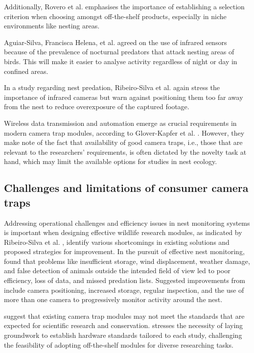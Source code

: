 \documentclass[class=report,11pt,crop=false]{standalone}
\begin{document}
Additionally, Rovero et al. \cite{rovero2013which} emphasises the importance of establishing a selection criterion when choosing amongst off-the-shelf products, especially in niche environments like nesting areas.

Aguiar-Silva, Francisca Helena, et al. \cite{aguiar-silva2017camera} agreed on the use of infrared sensors because of the prevalence of nocturnal predators that attack nesting areas of birds. This will make it easier to analyse activity regardless of night or day in confined areas.

In a study regarding nest predation, Ribeiro-Silva et al. \cite{ribeiro-silva2018testing} again stress the importance of infrared cameras but warn against positioning them too far away from the nest to reduce overexposure of the captured footage.

Wireless data transmission and automation emerge as crucial requirements in modern camera trap modules, according to Glover-Kapfer et al. \cite{glover2019camera}. However, they make note of the fact that availability of good camera traps, i.e., those that are relevant to the researchers’ requirements, is often dictated by the novelty task at hand, which may limit the available options for studies in nest ecology.  

\subsection{Challenges and limitations of consumer camera traps}

Addressing operational challenges and efficiency issues in nest monitoring systems is important when designing effective wildlife research modules, as indicated by Ribeiro-Silva  et al. \cite{ribeiro-silva2018testing}, identify various shortcomings in existing solutions and proposed strategies for improvement. In the pursuit of effective nest monitoring, \cite{ribeiro-silva2018testing} found that problems like insufficient storage, wind displacement, weather damage, and false detection of animals outside the intended field of view led to poor efficiency, loss of data, and missed predation lists. Suggested improvements from \cite{ribeiro-silva2018testing} include camera positioning, increased storage, regular inspection, and the use of more than one camera to progressively monitor activity around the nest. 

\cite{ahumada2020wildlife} suggest that existing camera trap modules may not meet the standards that are expected for scientific research and conservation. \cite{ahumada2020wildlife} stresses the necessity of laying groundwork to establish hardware standards tailored to each study, challenging the feasibility of adopting off-the-shelf modules for diverse researching tasks. 
\end{document}
